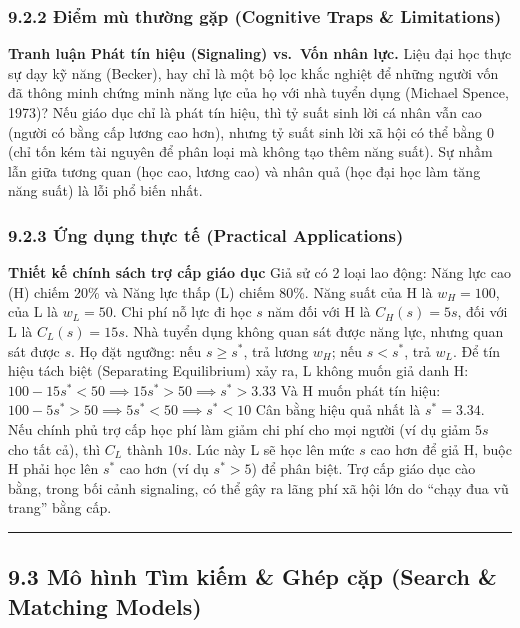 \documentclass[
]{article}
\begin{document}
\subsubsection{9.2.2 Điểm mù thường gặp (Cognitive Traps \&
Limitations)}\label{ux111iux1ec3m-muxf9-thux1b0ux1eddng-gux1eb7p-cognitive-traps-limitations-70}

\textbf{Tranh luận Phát tín hiệu (Signaling) vs.~Vốn nhân lực.} Liệu đại
học thực sự dạy kỹ năng (Becker), hay chỉ là một bộ lọc khắc nghiệt để
những người vốn đã thông minh chứng minh năng lực của họ với nhà tuyển
dụng (Michael Spence, 1973)? Nếu giáo dục chỉ là phát tín hiệu, thì tỷ
suất sinh lời cá nhân vẫn cao (người có bằng cấp lương cao hơn), nhưng
tỷ suất sinh lời xã hội có thể bằng 0 (chỉ tốn kém tài nguyên để phân
loại mà không tạo thêm năng suất). Sự nhầm lẫn giữa tương quan (học cao,
lương cao) và nhân quả (học đại học làm tăng năng suất) là lỗi phổ biến
nhất.

\subsubsection{9.2.3 Ứng dụng thực tế (Practical
Applications)}\label{ux1ee9ng-dux1ee5ng-thux1ef1c-tux1ebf-practical-applications-34}

\textbf{Thiết kế chính sách trợ cấp giáo dục} Giả sử có 2 loại lao động:
Năng lực cao (H) chiếm 20\% và Năng lực thấp (L) chiếm 80\%. Năng suất
của H là \(w_H = 100\), của L là \(w_L = 50\). Chi phí nỗ lực đi học
\(s\) năm đối với H là \(C_H(s) = 5s\), đối với L là \(C_L(s) = 15s\).
Nhà tuyển dụng không quan sát được năng lực, nhưng quan sát được \(s\).
Họ đặt ngưỡng: nếu \(s \geq s^*\), trả lương \(w_H\); nếu \(s < s^*\),
trả \(w_L\). Để tín hiệu tách biệt (Separating Equilibrium) xảy ra, L
không muốn giả danh H:
\(100 - 15s^* < 50 \implies 15s^* > 50 \implies s^* > 3.33\) Và H muốn
phát tín hiệu: \(100 - 5s^* > 50 \implies 5s^* < 50 \implies s^* < 10\)
Cân bằng hiệu quả nhất là \(s^* = 3.34\). Nếu chính phủ trợ cấp học phí
làm giảm chi phí cho mọi người (ví dụ giảm \(5s\) cho tất cả), thì
\(C_L\) thành \(10s\). Lúc này L sẽ học lên mức \(s\) cao hơn để giả H,
buộc H phải học lên \(s^*\) cao hơn (ví dụ \(s^* > 5\)) để phân biệt.
Trợ cấp giáo dục cào bằng, trong bối cảnh signaling, có thể gây ra lãng
phí xã hội lớn do ``chạy đua vũ trang'' bằng cấp.

\begin{center}\rule{0.5\linewidth}{0.5pt}\end{center}

\subsection{9.3 Mô hình Tìm kiếm \& Ghép cặp (Search \& Matching
Models)}\label{muxf4-huxecnh-tuxecm-kiux1ebfm-ghuxe9p-cux1eb7p-search-matching-models}
\end{document}
